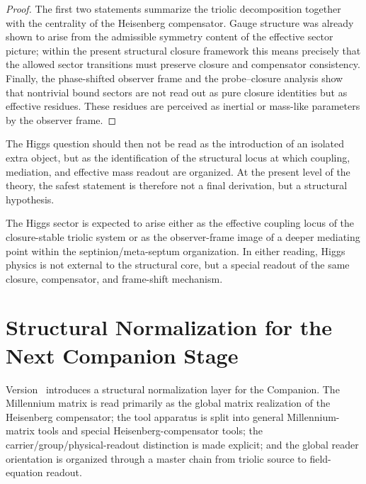 \begin{proof}
The first two statements summarize the triolic decomposition together with the
centrality of the Heisenberg compensator. Gauge structure was already shown to
arise from the admissible symmetry content of the effective sector picture;
within the present structural closure framework this means precisely that the
allowed sector transitions must preserve closure and compensator consistency.
Finally, the phase-shifted observer frame and the probe--closure analysis show
that nontrivial bound sectors are not read out as pure closure identities but
as effective residues. These residues are perceived as inertial or mass-like
parameters by the observer frame.
\end{proof}

The Higgs question should then not be read as the introduction of an isolated
extra object, but as the identification of the structural locus at which
coupling, mediation, and effective mass readout are organized. At the present
level of the theory, the safest statement is therefore not a final derivation,
but a structural hypothesis.

\begin{remark}
\label{rem:structural-higgs-role}
The Higgs sector is expected to arise either as the effective coupling locus of
the closure-stable triolic system or as the observer-frame image of a deeper
mediating point within the septinion/meta-septum organization. In either
reading, Higgs physics is not external to the structural core, but a special
readout of the same closure, compensator, and frame-shift mechanism.
\end{remark}




\section{Structural Normalization for the Next Companion Stage}
\label{sec:structural-normalization}

\begin{remark}
Version \docversion\ introduces a structural normalization layer for the
Companion. The Millennium matrix is read primarily as the global matrix
realization of the Heisenberg compensator; the tool apparatus is split into
general Millennium-matrix tools and special Heisenberg-compensator tools; the
carrier/group/physical-readout distinction is made explicit; and the global
reader orientation is organized through a master chain from triolic source to
field-equation readout.
\end{remark}

